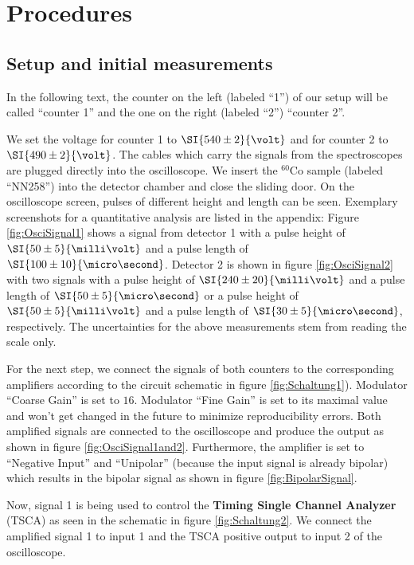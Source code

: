 \section{Procedures}
%
\subsection{Setup and initial measurements}
%
In the following text, the counter on the left (labeled \enquote{1}) of our setup will be called \enquote{counter 1} and the one on the right (labeled \enquote{2}) \enquote{counter 2}.
%
\par
%
We set the voltage for counter 1 to $\SI{540 \pm 2}{\volt}$ and for counter 2 to $\SI{490 \pm 2}{\volt}$.
The cables which carry the signals from the spectroscopes are plugged directly into the oscilloscope.
We insert the $^{60}\text{Co}$ sample (labeled \enquote{NN258}) into the detector chamber and close the sliding door.
On the oscilloscope screen, pulses of different height and length can be seen.
Exemplary screenshots for a quantitative analysis are listed in the appendix:
Figure \ref{fig:OsciSignal1} shows a signal from detector 1 with a pulse height of $\SI{50 \pm 5}{\milli\volt}$ and a pulse length of $\SI{100 \pm 10}{\micro\second}$.
Detector 2 is shown in figure \ref{fig:OsciSignal2} with two signals with a pulse height of $\SI{240 \pm 20}{\milli\volt}$ and a pulse length of $\SI{50 \pm 5}{\micro\second}$ or a pulse height of $\SI{50 \pm 5}{\milli\volt}$ and a pulse length of $\SI{30 \pm 5}{\micro\second}$, respectively.
The uncertainties for the above measurements stem from reading the scale only.
%
\par
%
For the next step, we connect the signals of both counters to the corresponding amplifiers according to the circuit schematic in figure \ref{fig:Schaltung1}).
Modulator \enquote{Coarse Gain} is set to $16$.
Modulator \enquote{Fine Gain} is set to its maximal value and won't get changed in the future to minimize reproducibility errors.
Both amplified signals are connected to the oscilloscope and produce the output as shown in figure \ref{fig:OsciSignal1and2}.
Furthermore, the amplifier is set to \enquote{Negative Input} and \enquote{Unipolar} (because the input signal is already bipolar) which results in the bipolar signal as shown in figure \ref{fig:BipolarSignal}.
%
\par
%
Now, signal 1 is being used to control the \textbf{Timing Single Channel Analyzer} (TSCA) as seen in the schematic in figure \ref{fig:Schaltung2}.
We connect the amplified signal 1 to input 1 and the TSCA positive output to input 2 of the oscilloscope.
